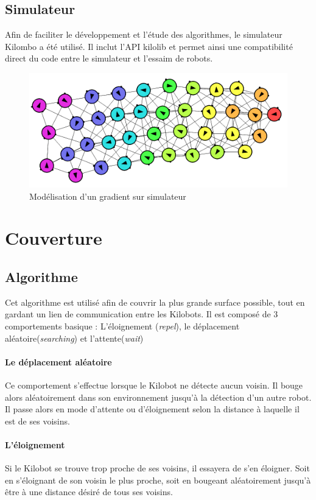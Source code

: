 \documentclass[a4paper]{article}
\begin{document}
\subsection{Simulateur}
Afin de faciliter le développement et l'étude des algorithmes, le simulateur Kilombo \cite{jansson_kilombo:_2015} a été utilisé. Il inclut l'API kilolib et permet ainsi une compatibilité direct du code entre le simulateur et l'essaim de robots.
\begin{figure}[h!]
	\begin{center}
		\centering
		\includegraphics[width=0.8\linewidth]{../../script_results/gradient2-sim.png}
		\caption{Modélisation  d'un gradient sur simulateur}
	\end{center}
\end{figure} 
\newpage
\section{Couverture}
\subsection{Algorithme}
Cet algorithme est utilisé afin de couvrir la plus grande surface possible, tout en gardant un lien de communication entre les Kilobots.
Il est composé de 3 comportements basique : L'éloignement (\textit{repel}), le déplacement aléatoire(\textit{searching}) et l'attente(\textit{wait})
\paragraph{Le déplacement aléatoire} Ce comportement s'effectue lorsque le Kilobot ne détecte aucun voisin. Il bouge alors aléatoirement dans son environnement jusqu'à la détection d'un autre robot. Il passe alors en mode d'attente ou d'éloignement selon la distance à laquelle il est de ses voisins.
\paragraph{L'éloignement} Si le Kilobot se trouve trop proche de ses voisins, il essayera de s'en éloigner. Soit en s'éloignant de son voisin le plus proche, soit en bougeant aléatoirement jusqu'à être à une distance désiré de tous ses voisins.
\end{document}
